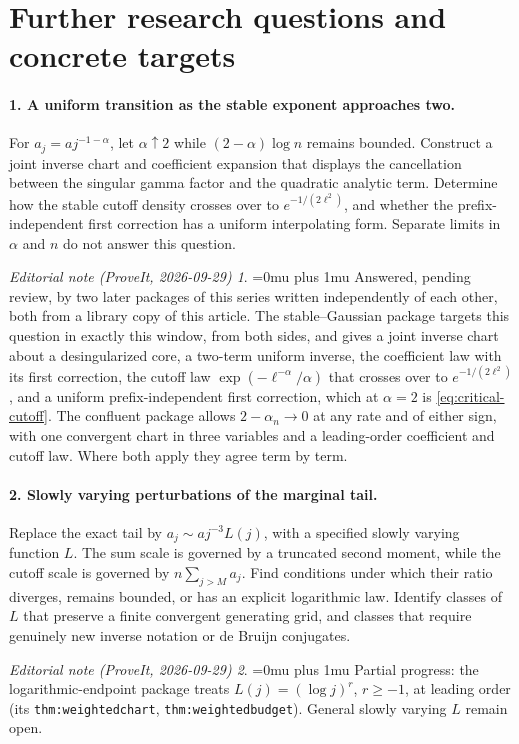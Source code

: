 \documentclass[11pt,a4paper]{article}
\numberwithin{equation}{section}
\theoremstyle{definition}
\theoremstyle{remark}
\newtheorem*{ednoteinner}{Editorial note (ProveIt, 2026-09-29)}
\newenvironment{ednote}{\begin{ednoteinner}\sloppy\Urlmuskip=0mu plus 1mu\relax}{\end{ednoteinner}}
\begin{document}
\section{Further research questions and concrete targets}
\label{sec:questions}

\paragraph{1. A uniform transition as the stable exponent approaches two.}
For \(a_j=a j^{-1-\alpha}\), let \(\alpha\uparrow2\) while
\((2-\alpha)\log n\) remains bounded. Construct a joint inverse chart and
coefficient expansion that displays the cancellation between the singular
gamma factor and the quadratic analytic term. Determine how the stable
cutoff density crosses over to \(e^{-1/(2\ell^2)}\), and whether the
prefix-independent first correction has a uniform interpolating form.
Separate limits in \(\alpha\) and \(n\) do not answer this question.
\begin{ednote}
Answered, pending review, by two later packages of this series written
independently of each other, both from a library copy of this article. The
stable--Gaussian package \cite{ed:sge} targets this question in exactly this
window, from both sides, and gives a joint inverse chart about a
desingularized core, a two-term uniform inverse, the coefficient law with its
first correction, the cutoff law
\(\exp(-\ell^{-\alpha}/\alpha)\) that crosses over to \(e^{-1/(2\ell^2)}\), and
a uniform prefix-independent first correction, which at \(\alpha=2\) is
\eqref{eq:critical-cutoff}. The confluent package \cite{ed:cct} allows
\(2-\alpha_n\to0\) at any rate and of either sign, with one convergent chart
in three variables and a leading-order coefficient and cutoff law. Where
both apply they agree term by term.
\end{ednote}

\paragraph{2. Slowly varying perturbations of the marginal tail.}
Replace the exact tail by \(a_j\sim a j^{-3}L(j)\), with a specified slowly
varying function \(L\). The sum scale is governed by a truncated second
moment, while the cutoff scale is governed by \(n\sum_{j>M}a_j\).
Find conditions under which their ratio diverges, remains bounded, or has
an explicit logarithmic law. Identify classes of \(L\) that preserve a
finite convergent generating grid, and classes that require genuinely new
inverse notation or de Bruijn conjugates.
\begin{ednote}
Partial progress: the logarithmic-endpoint package \cite{ed:lce} treats
\(L(j)=(\log j)^r\), \(r\ge-1\), at leading order (its
\texttt{thm:weightedchart}, \texttt{thm:weightedbudget}). General slowly
varying \(L\) remain open.
\end{ednote}
\end{document}
